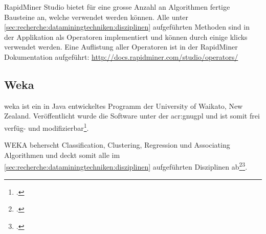 RapidMiner Studio bietet für eine grosse Anzahl an Algorithmen fertige Bausteine an, welche verwendet werden können. Alle unter \cref{sec:recherche:dataminingtechniken:disziplinen}  aufgeführten Methoden sind in der Applikation als Operatoren implementiert und können durch einige klicks verwendet werden. Eine Auflistung aller Operatoren ist in der RapidMiner Dokumentation aufgeführt: \url{http://docs.rapidminer.com/studio/operators/}

\subsection{Weka}
\gls{weka} ist ein in Java entwickeltes Programm der University of Waikato, New Zealand. Veröffentlicht wurde die Software unter der \gls{acr:gnugpl} und ist somit frei verfüg- und modifizierbar\footcite{Weka_2017-01-14}.

WEKA beherscht Classification, Clustering, Regression und Associating Algorithmen und deckt somit alle  im \cref{sec:recherche:dataminingtechniken:disziplinen} aufgeführten Disziplinen ab\footcite{Weka_Doc_2017-01-14}\footcite{Weka_Regression_2017-01-14}.

